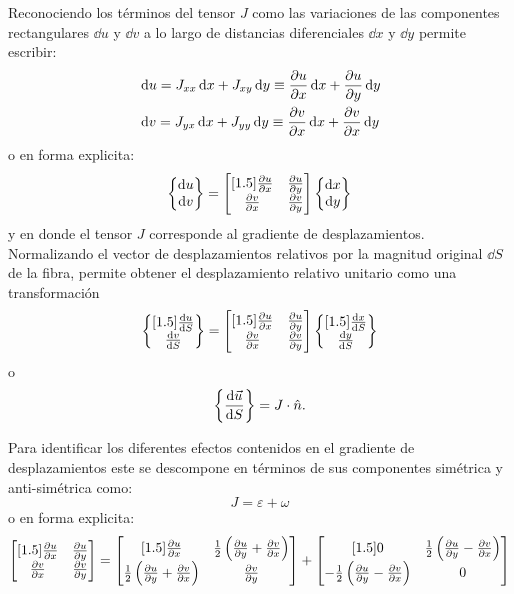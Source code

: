 \documentclass[../notas medios.tex]{subfiles}
\begin{document}
Reconociendo los términos del tensor $J$ como las variaciones de las 
componentes rectangulares $\dd{u}$ y $\dd{v}$ a lo largo de distancias 
diferenciales $\dd{x}$ y $\dd{y}$ permite escribir:
\begin{align*}
&\dd{u} = J_{xx} \dd{x} + J_{xy}\dd{y} \equiv \pdv{u}{x}\dd{x} + 
\pdv{u}{y}\dd{y}\\
&\dd{v} = J_{yx}\dd{x} + J_{yy}\dd{y} \equiv \pdv{v}{x}\dd{x} + 
\pdv{v}{x}\dd{y}
\end{align*}
o en forma explicita:
\[\begin{Bmatrix}
\dd{u}\\
\dd{v}
\end{Bmatrix} = \begin{bmatrix}[1.5]
\pdv{u}{x} &\pdv{u}{y}\\
\pdv{v}{x} &\pdv{v}{y}
\end{bmatrix}\begin{Bmatrix}
\dd{x}\\
\dd{y}
\end{Bmatrix}\]
y en donde el tensor $J$ corresponde al gradiente de desplazamientos. 
Normalizando el vector de desplazamientos relativos por la magnitud original 
$\dd{S}$ de la fibra, permite obtener el desplazamiento relativo unitario como 
una transformación
\[\begin{Bmatrix}[1.5]
\dv{u}{S}\\
\dv{v}{S}
\end{Bmatrix} = \begin{bmatrix}[1.5]
\pdv{u}{x} &\pdv{u}{y}\\
\pdv{v}{x} &\pdv{v}{y}
\end{bmatrix} \begin{Bmatrix}[1.5]
\dv{x}{S}\\
\dv{y}{S}
\end{Bmatrix}\]
o
\begin{equation}
\left\{\dv{\vec u}{S}\right\}  = J \cdot \hat n.
\label{trans}
\end{equation}

Para identificar los diferentes efectos contenidos en el gradiente de 
desplazamientos este se descompone en términos de sus componentes simétrica y 
anti-simétrica como:
\[J = \varepsilon  + \omega \]
o en forma explicita:
\[\begin{bmatrix}[1.5]
\pdv{u}{x} &\pdv{u}{y}\\
\pdv{v}{x} &\pdv{v}{y}
\end{bmatrix} = \begin{bmatrix}[1.5]
\pdv{u}{x} &\frac{1}{2}\left(\pdv{u}{y} + \pdv{v}{x}\right)\\
\frac{1}{2}\left(\pdv{u}{y} + \pdv{v}{x}\right) &\pdv{v}{y}
\end{bmatrix} + \begin{bmatrix}[1.5]
0 &\frac{1}{2}\left(\pdv{u}{y} - \pdv{v}{x}\right)\\
-\frac{1}{2}\left(\pdv{u}{y} - \pdv{v}{x}\right) &0
\end{bmatrix}\]
\end{document}

